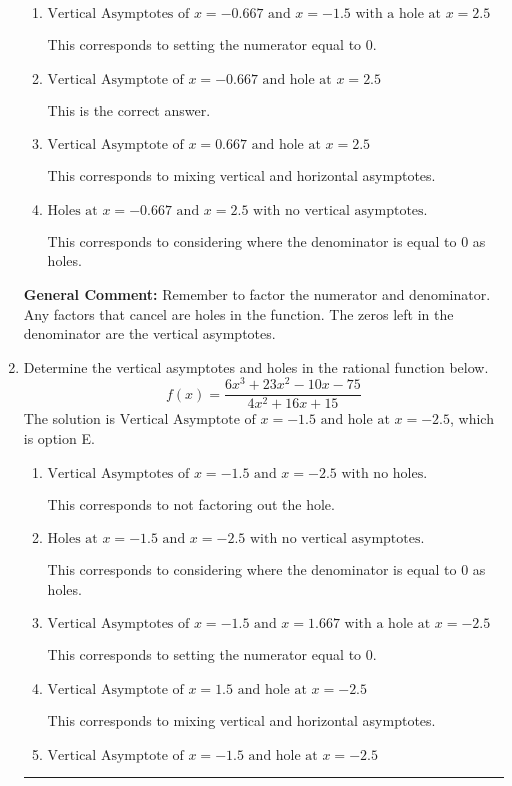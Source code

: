 \documentclass{extbook}[14pt]
\newcommand{\litem}[1]{\item #1

\rule{\textwidth}{0.4pt}}
\begin{document}
\begin{enumerate}
{\begin{enumerate}[label=\Alph*.]
This corresponds to not factoring out the hole.
\item \( \text{Vertical Asymptotes of } x = -0.667 \text{ and } x = -1.5 \text{ with a hole at } x = 2.5 \)

This corresponds to setting the numerator equal to 0.
\item \( \text{Vertical Asymptote of } x = -0.667 \text{ and hole at } x = 2.5 \)

This is the correct answer.
\item \( \text{Vertical Asymptote of } x = 0.667 \text{ and hole at } x = 2.5 \)

This corresponds to mixing vertical and horizontal asymptotes.
\item \( \text{Holes at } x = -0.667 \text{ and } x = 2.5 \text{ with no vertical asymptotes.} \)

This corresponds to considering where the denominator is equal to 0 as holes.
\end{enumerate}

\textbf{General Comment:} Remember to factor the numerator and denominator. Any factors that cancel are holes in the function. The zeros left in the denominator are the vertical asymptotes.
}
\litem{
Determine the vertical asymptotes and holes in the rational function below.
\[ f(x) = \frac{6x^{3} +23 x^{2} -10 x -75}{4x^{2} +16 x + 15} \]The solution is \( \text{Vertical Asymptote of } x = -1.5 \text{ and hole at } x = -2.5 \), which is option E.\begin{enumerate}[label=\Alph*.]
\item \( \text{Vertical Asymptotes of } x = -1.5 \text{ and } x = -2.5 \text{ with no holes.} \)

This corresponds to not factoring out the hole.
\item \( \text{Holes at } x = -1.5 \text{ and } x = -2.5 \text{ with no vertical asymptotes.} \)

This corresponds to considering where the denominator is equal to 0 as holes.
\item \( \text{Vertical Asymptotes of } x = -1.5 \text{ and } x = 1.667 \text{ with a hole at } x = -2.5 \)

This corresponds to setting the numerator equal to 0.
\item \( \text{Vertical Asymptote of } x = 1.5 \text{ and hole at } x = -2.5 \)

This corresponds to mixing vertical and horizontal asymptotes.
\item \( \text{Vertical Asymptote of } x = -1.5 \text{ and hole at } x = -2.5 \)


\end{enumerate}}
\end{enumerate}
\end{document}
